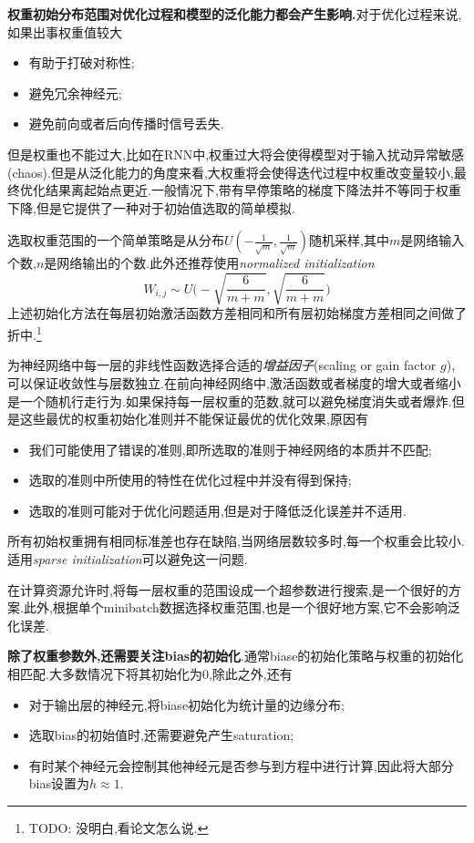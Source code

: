 \textbf{权重初始分布范围对优化过程和模型的泛化能力都会产生影响.}对于优化过程来说,如果出事权重值较大
\begin{itemize}
    \item 有助于打破对称性;
    \item 避免冗余神经元;
    \item 避免前向或者后向传播时信号丢失.
\end{itemize}
但是权重也不能过大,比如在RNN中,权重过大将会使得模型对于输入扰动异常敏感(chaos).但是从泛化能力的角度来看,大权重将会使得迭代过程中权重改变量较小,最终优化结果离起始点更近.一般情况下,带有早停策略的梯度下降法并不等同于权重下降,但是它提供了一种对于初始值选取的简单模拟.

选取权重范围的一个简单策略是从分布$U(-\frac{1}{\sqrt{m}},\frac{1}{\sqrt{m}})$随机采样,其中$m$是网络输入个数,$n$是网络输出的个数.此外还推荐使用\textit{normalized initialization}
\begin{equation}
W_{i,j}\sim U\Big(-\sqrt{\frac{6}{m+m}},\sqrt{\frac{6}{m+m}}\Big)
\end{equation}
上述初始化方法在每层初始激活函数方差相同和所有层初始梯度方差相同之间做了折中.\footnote{TODO: 没明白,看论文怎么说.}

为神经网络中每一层的非线性函数选择合适的\textit{增益因子}(scaling or gain factor $g$),可以保证收敛性与层数独立.在前向神经网络中,激活函数或者梯度的增大或者缩小是一个随机行走行为.如果保持每一层权重的范数,就可以避免梯度消失或者爆炸.但是这些最优的权重初始化准则并不能保证最优的优化效果,原因有
\begin{itemize}
    \item 我们可能使用了错误的准则,即所选取的准则于神经网络的本质并不匹配;
    \item 选取的准则中所使用的特性在优化过程中并没有得到保持;
    \item 选取的准则可能对于优化问题适用,但是对于降低泛化误差并不适用.
\end{itemize}

所有初始权重拥有相同标准差也存在缺陷,当网络层数较多时,每一个权重会比较小.适用\textit{sparse initialization}可以避免这一问题.

在计算资源允许时,将每一层权重的范围设成一个超参数进行搜索,是一个很好的方案.此外,根据单个minibatch数据选择权重范围,也是一个很好地方案,它不会影响泛化误差.

\textbf{除了权重参数外,还需要关注bias的初始化}.通常biase的初始化策略与权重的初始化相匹配.大多数情况下将其初始化为$0$,除此之外,还有
\begin{itemize}
    \item 对于输出层的神经元,将biase初始化为统计量的边缘分布;
    \item 选取bias的初始值时,还需要避免产生saturation;
    \item 有时某个神经元会控制其他神经元是否参与到方程中进行计算,因此将大部分bias设置为$h\approx 1$.
\end{itemize}

